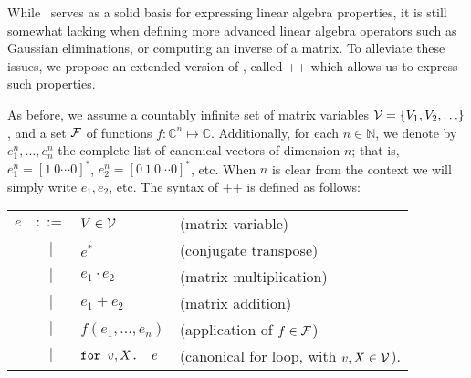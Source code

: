 


While \lang\ serves as a solid basis for expressing linear algebra properties, it is still somewhat lacking when defining more advanced linear algebra operators such as Gaussian eliminations, or computing an inverse of a matrix. To alleviate these issues, we propose an extended version of \lang, called \lang++ which allows us to express such properties.

As before, we assume a countably infinite set of matrix variables $\mathcal{V} = \{V_1, V_2, \ldots\}$, and a set $\mathcal{F}$  of functions $f:\mathbb{C}^n \mapsto \mathbb{C}$. Additionally, for each $n\in \mathbb{N}$, we denote by $e_1^n,\ldots ,e_n^n$ the complete list of canonical vectors of dimension $n$; that is, $e_1^n = [1\ 0 \cdots 0]^*$, $e_2^n = [0\ 1\ 0 \cdots 0]^*$, etc. When $n$ is clear from the context we will simply write $e_1,e_2$, etc. The syntax of \lang++ is defined as follows:


\medskip

\begin{tabular}{lcll}
$e$ & $::=$ & $V\in \mathcal{V}$ & (matrix variable)\\
 & $|$ & $e^*$ & (conjugate transpose)\\ 
 & $|$ & $e_1 \cdot e_2$ & (matrix multiplication)\\   
 & $|$ & $e_1 + e_2$ & (matrix addition)\\    
 & $|$ & $f(e_1,\ldots ,e_n)$ & (application of $f\in \mathcal{F}$)\\
 & $|$ & $\texttt{for }v,X \texttt{. }e$ & (canonical for loop, with $v, X \in \mathcal{V}$). 
\end{tabular}

